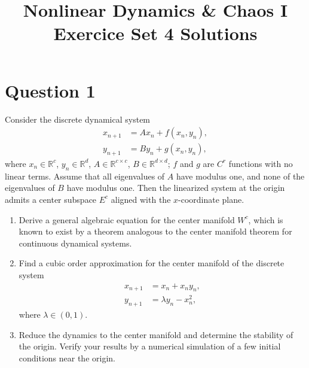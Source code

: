 \documentclass[twoside,10pt,a4paper]{article}
\title{\huge \textbf{Nonlinear Dynamics \& Chaos I \\ \Large Exercice Set 4 Solutions}}	%
\author{ }		%
\date{ }	%
\begin{document}
\maketitle

\section*{Question 1}
Consider the discrete dynamical system
\begin{align*}
	x_{n+1} &= Ax_n + f(x_n, y_n), \\
	y_{n+1} &= By_n + g(x_n, y_n),
\end{align*}
where $x_n \in \mathbb{R}^c$, $y_n \in \mathbb{R}^d$, $A \in \mathbb{R}^{c \times c}$, $B \in \mathbb{R}^{d \times d}$; $f$ and $g$ are $C^r$ functions with no linear terms. Assume that all eigenvalues of $A$ have modulus one, and none of the eigenvalues of $B$ have modulus one. Then the linearized system at the origin admits a center subspace $E^c$ aligned with the $x$-coordinate plane.

\begin{enumerate}[label=(\alph*)]
	\item Derive a general algebraic equation for the center manifold $W^c$, which is known to exist by a theorem analogous to the center manifold theorem for continuous dynamical systems.
	\item Find a cubic order approximation for the center manifold of the discrete system
	\begin{align*}
		x_{n+1} &= x_n + x_ny_n, \\
		y_{n+1} &= \lambda y_n - x_n^2,
	\end{align*}
	where $\lambda \in (0,1).$
	\item Reduce the dynamics to the center manifold and determine the stability of the origin. Verify your results by a numerical simulation of a few initial conditions near the origin.
\end{enumerate}
\end{document}
